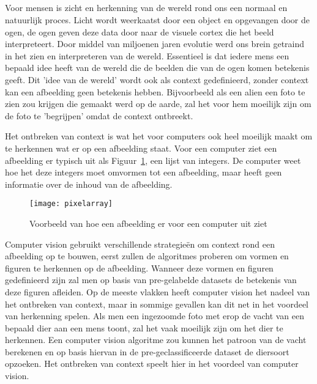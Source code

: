\subsection{}
\label{sec:how-do-computer-see}

Voor mensen is zicht en herkenning van de wereld rond ons een normaal en natuurlijk proces. Licht wordt weerkaatst door een object en opgevangen door de ogen, de ogen geven deze data door naar de visuele cortex die het beeld interpreteert. Door middel van miljoenen jaren evolutie werd ons brein getraind in het zien en interpreteren van de wereld. Essentieel is dat iedere mens een bepaald idee heeft van de wereld die de beelden die van de ogen komen betekenis geeft. Dit 'idee van de wereld' wordt ook als context gedefinieerd, zonder context kan een afbeelding geen betekenis hebben.
Bijvoorbeeld als een alien een foto te zien zou krijgen die gemaakt werd op de aarde, zal het voor hem moeilijk zijn om de foto te 'begrijpen' omdat de context ontbreekt.

Het ontbreken van context is wat het voor computers ook heel moeilijk maakt om te herkennen wat er op een afbeelding staat. Voor een computer ziet een afbeelding er typisch uit als Figuur~\ref{fig:pixelarray}, een lijst van integers. De computer weet hoe het deze integers moet omvormen tot een afbeelding, maar heeft geen informatie over de inhoud van de afbeelding.

\begin{figure}
    \centering
    \texttt{[image: pixelarray]}
    \caption{Voorbeeld van hoe een afbeelding er voor een computer uit ziet \autocite{pythonprogramming2021}}
    \label{fig:pixelarray}
\end{figure}

Computer vision gebruikt verschillende strategieën om context rond een afbeelding op te bouwen, eerst zullen de algoritmes proberen om vormen en figuren te herkennen op de afbeelding. Wanneer deze vormen en figuren gedefinieerd zijn zal men op basis van pre-gelabelde datasets de betekenis van deze figuren afleiden. Op de meeste vlakken heeft computer vision het nadeel van het ontbreken van context, maar in sommige gevallen kan dit net in het voordeel van herkenning spelen. Als men een ingezoomde foto met erop de vacht van een bepaald dier aan een mens toont, zal het vaak moeilijk zijn om het dier te herkennen. Een computer vision algoritme zou kunnen het patroon van de vacht berekenen en op basis hiervan in de pre-geclassificeerde dataset de diersoort opzoeken. Het ontbreken van context speelt hier in het voordeel van computer vision.

